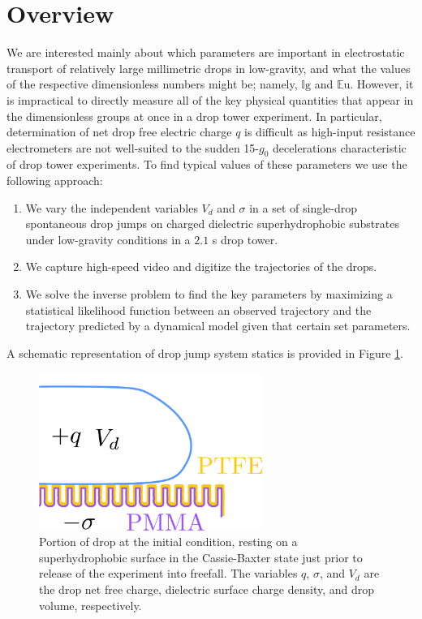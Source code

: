 \documentclass[12pt,a4paper,oneside]{book}
\begin{document}
\section{Overview}
We are interested mainly about which parameters are important in electrostatic transport of relatively large millimetric drops in low-gravity, and what the values of the respective dimensionless numbers might be; namely, $\mathbb{I}\mbox{g}$ and $\mathbb{E}\mbox{u}$. However, it is impractical to directly measure all of the key physical quantities that appear in the dimensionless groups at once in a drop tower experiment. In particular, determination of net drop free electric charge $q$ is difficult as high-input resistance electrometers are not well-suited to the sudden 15-$g_0$ decelerations characteristic of drop tower experiments. To find typical values of these parameters we use the following approach:
\begin{enumerate}
\item We vary the independent variables $V_d$ and $\sigma$ in a set of single-drop spontaneous drop jumps on charged dielectric superhydrophobic substrates under low-gravity conditions in a $2.1$ s drop tower. 
\item We capture high-speed video and digitize the trajectories of the drops. 
\item We solve the inverse problem to find the key parameters by maximizing a statistical likelihood function between an observed trajectory and the trajectory predicted by a dynamical model given that certain set parameters.
\end{enumerate}
A schematic representation of drop jump system statics is provided in Figure \ref{fig:schematic}.
\begin{figure}[ht]
 \centering
 \includegraphics[width=0.65\textwidth]{../figures/schematic.pdf}
 \caption{Portion of drop at the initial condition, resting on a superhydrophobic surface in the Cassie-Baxter state just prior to release of the experiment into freefall. The variables $q$, $\sigma$, and $V_d$ are the drop net free charge, dielectric surface charge density, and drop volume, respectively.\label{fig:schematic}}
\end{figure}
\end{document}
